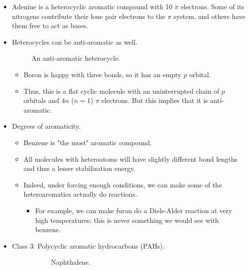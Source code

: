 \documentclass[../notes.tex]{subfiles}
\begin{document}
\begin{itemize}
\begin{itemize}
    \end{itemize}
    \item Adenine is a heterocyclic aromatic compound with 10 $\pi$ electrons. Some of its nitrogens contribute their lone pair electrons to the $\pi$ system, and others have them free to act as bases.
    \item Heterocycles can be anti-aromatic as well.
    \begin{figure}[h!]
        \centering
        \footnotesize
        \caption{An anti-aromatic heterocycle.}
        \label{fig:antiaromatiHeterocycle}
    \end{figure}
    \begin{itemize}
        \item Boron is happy with three bonds, so it has an empty $p$ orbital.
        \item Thus, this is a flat cyclic molecule with an uninterrupted chain of $p$ orbitals and $4n$ ($n=1$) $\pi$ electrons. But this implies that it is anti-aromatic.
    \end{itemize}
    \item Degrees of aromaticity.
    \begin{itemize}
        \item Benzene is "the most" aromatic compound.
        \item All molecules with heteroatoms will have slightly different bond lengths and thus a lesser stabilization energy.
        \item Indeed, under forcing enough conditions, we can make some of the heteroaromatics actually do reactions.
        \begin{itemize}
            \item For example, we can make furan do a Diels-Alder reaction at very high temperatures; this is never something we would see with benzene.
        \end{itemize}
    \end{itemize}
    \item Class 3: Polycyclic aromatic hydrocarbons (PAHs).
    \begin{figure}[h!]
        \centering
        \footnotesize
        \begin{subfigure}[b]{0.24\linewidth}
            \centering
            \caption{Naphthalene.}
            \label{fig:commonPAHsa}
        \end{subfigure}
        \begin{subfigure}[b]{0.24\linewidth}

\end{subfigure}
\end{figure}
\end{itemize}
\end{document}

